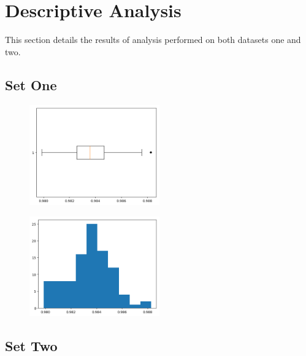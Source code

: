 \documentclass[10pt]{report}
\begin{document}
\newpage

\section*{Descriptive Analysis}

This section details the results of analysis performed on both datasets one and two.


\subsection*{Set One}

\begin{figure}
    \centering
    \includegraphics[width=0.50\textwidth]{results/resistor_boxplot}
\end{figure}

\lipsum[1]


\begin{figure}
    \centering
    \includegraphics[width=0.50\textwidth]{results/resistor_histogram}
\end{figure}

\lipsum[2-3]

\newpage

\subsection*{Set Two}
\end{document}
